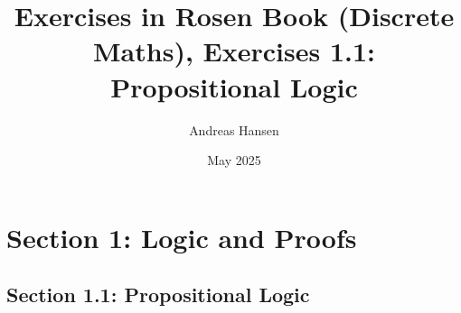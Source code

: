 \documentclass{article}
\title{Exercises in Rosen Book (Discrete Maths), Exercises 1.1: Propositional Logic}
\author{Andreas Hansen}
\date{May 2025}
\numberwithin{equation}{section}
\numberwithin{equation}{subsection}
\begin{document}
\maketitle

\section*{Section 1: Logic and Proofs}
\subsection*{Section 1.1: Propositional Logic}









\end{document}
